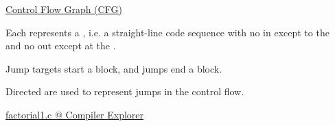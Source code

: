\begin{frame}{}
	\begin{center}
		\href{https://en.wikipedia.org/wiki/Control-flow_graph}{Control Flow Graph (CFG)}

		\vspace{0.50cm}
		\begin{definition}[CFG]
			Each  represents a \emph{},
			i.e. a straight-line code sequence
			with no  in except to the  \\
			and no  out except at the .

			\vspace{0.80cm}
			\pause
			Jump targets start a block, and jumps end a block.

			\vspace{0.80cm}
			\pause
			Directed  are used to represent jumps in the control flow.
		\end{definition}
	\end{center}
\end{frame}


\begin{frame}{}
	\begin{center}
		\href{https://godbolt.org/z/c3j3srE1o}{factorial1.c @ Compiler Explorer}

		\vspace{0.30cm}
	\end{center}
\end{frame}

\begin{frame}{}
	\begin{center}
	\end{center}
\end{frame}

